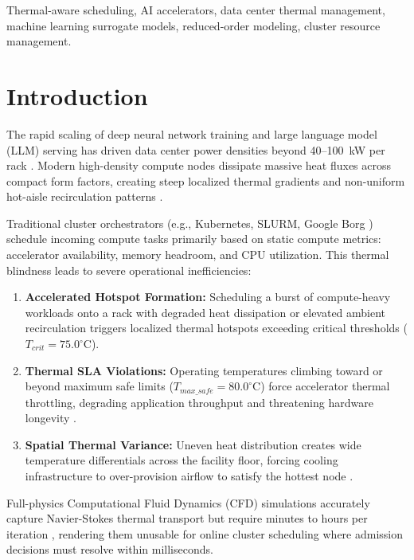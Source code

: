 \documentclass[conference,10pt]{IEEEtran}
\begin{document}
\begin{IEEEkeywords}
Thermal-aware scheduling, AI accelerators, data center thermal management, machine learning surrogate models, reduced-order modeling, cluster resource management.
\end{IEEEkeywords}

\section{Introduction}
The rapid scaling of deep neural network training and large language model (LLM) serving has driven data center power densities beyond 40--100~kW per rack \cite{patterson2021carbon, jouppi2023tpu, vaswani2017attention}. Modern high-density compute nodes dissipate massive heat fluxes across compact form factors, creating steep localized thermal gradients and non-uniform hot-aisle recirculation patterns \cite{moore2005temperature, tang2008thermal}. 

Traditional cluster orchestrators (e.g., Kubernetes, SLURM, Google Borg \cite{verma2015large}) schedule incoming compute tasks primarily based on static compute metrics: accelerator availability, memory headroom, and CPU utilization. This thermal blindness leads to severe operational inefficiencies:
\begin{enumerate}
    \item \textbf{Accelerated Hotspot Formation:} Scheduling a burst of compute-heavy workloads onto a rack with degraded heat dissipation or elevated ambient recirculation triggers localized thermal hotspots exceeding critical thresholds ($T_{crit} = 75.0^\circ\text{C}$).
    \item \textbf{Thermal SLA Violations:} Operating temperatures climbing toward or beyond maximum safe limits ($T_{max\_safe} = 80.0^\circ\text{C}$) force accelerator thermal throttling, degrading application throughput and threatening hardware longevity \cite{ashrae2021thermal}.
    \item \textbf{Spatial Thermal Variance:} Uneven heat distribution creates wide temperature differentials across the facility floor, forcing cooling infrastructure to over-provision airflow to satisfy the hottest node \cite{sharma2002balance}.
\end{enumerate}

Full-physics Computational Fluid Dynamics (CFD) simulations accurately capture Navier-Stokes thermal transport but require minutes to hours per iteration \cite{choi2008cfd}, rendering them unusable for online cluster scheduling where admission decisions must resolve within milliseconds.
\end{document}
